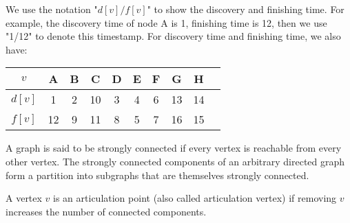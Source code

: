 \begin{eg}
\begin{figure}[H]
  \end{figure}
  We use the notation "\(d[v]/f[v]\)" to show the discovery and finishing time. For example, the discovery time of node A is 1, finishing time is 12, then we use "1/12" to denote this timestamp.
  For discovery time and finishing time, we also have:
  \begin{table}[H]
    \centering
    \begin{tabular}{c|c|c|c|c|c|c|c|c|c}
      \(v\)  & A & B & C & D & E & F & G & H \\
      \midrule
      \(d[v]\) & 1 & 2 & 10 & 3 & 4 & 6 & 13 & 14 \\
      \midrule
      \(f[v]\) & 12 & 9 & 11 & 8 & 5 & 7 & 16 & 15 \\
    \end{tabular}
  \end{table}
\end{eg}

A graph is said to be strongly connected if every vertex is reachable from every other vertex. The strongly connected components of an arbitrary directed graph form a partition into subgraphs that are themselves strongly connected.

A vertex \(v\) is an articulation point (also called articulation vertex) if removing \(v\) increases the number of connected components.

